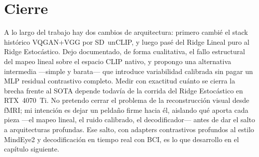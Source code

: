 \section{Cierre}

A lo largo del trabajo hay dos cambios de arquitectura: primero cambié el stack histórico VQGAN+VGG por SD~unCLIP, y luego pasé del Ridge Lineal puro al Ridge Estocástico. Dejo documentado, de forma cualitativa, el fallo estructural del mapeo lineal sobre el espacio CLIP nativo, y propongo una alternativa intermedia ---simple y barata--- que introduce variabilidad calibrada sin pagar un MLP residual contrastivo completo. Medir con exactitud cuánto se cierra la brecha frente al SOTA depende todavía de la corrida del Ridge Estocástico en RTX~4070~Ti. No pretendo cerrar el problema de la reconstrucción visual desde fMRI; mi intención es dejar un peldaño firme hacia él, aislando qué aporta cada pieza ---el mapeo lineal, el ruido calibrado, el decodificador--- antes de dar el salto a arquitecturas profundas. Ese salto, con adapters contrastivos profundos al estilo MindEye2 y decodificación en tiempo real con BCI, es lo que desarrollo en el capítulo siguiente.

\afterpage{\blankpage}

